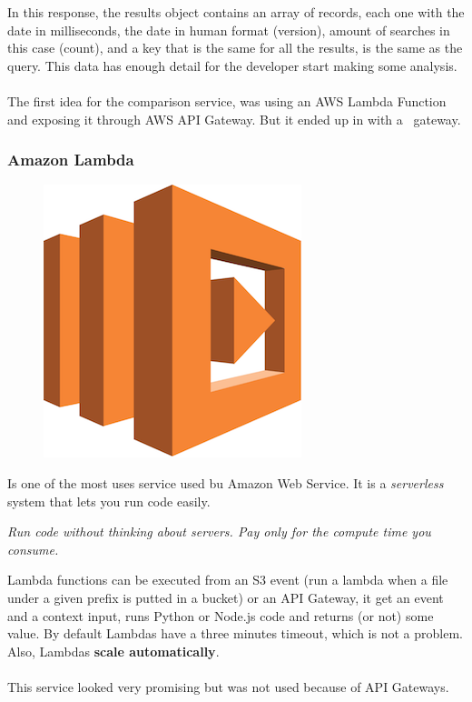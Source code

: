 In this response, the results object contains an array of records, each one with the date in milliseconds, the date in human format (version), amount of searches in this case (count), and a key that is the same for all the results, is the same as the query. This data has enough detail for the developer start making some analysis.
\\\\
The first idea for the comparison service, was using an AWS Lambda Function and exposing it through AWS API Gateway. But it ended up in  with a \company\ gateway.

\subsubsection*{Amazon Lambda} \label{lambda}

\begin{figure}[H]
\includegraphics[scale=0.1]{resources/lambda-logo.png}
\end{figure}

Is one of the most uses service used bu Amazon Web Service. It is a \textit{serverless} system that lets you run code easily.

\begin{displayquote}
\textit{Run code without thinking about servers. Pay only for the compute time you consume.}
\end{displayquote}

Lambda\cite{lambda} functions can be executed from an S3 event (run a lambda when a file under a given prefix is putted in a bucket) or an API Gateway, it get an event and a context input, runs Python\cite{python} or Node.js\cite{nodejs} code and returns (or not) some value. By default Lambdas have a three minutes timeout, which is not a problem. Also, Lambdas \textbf{scale automatically}.
\\\\
This service looked very promising but was not used because of API Gateways.

